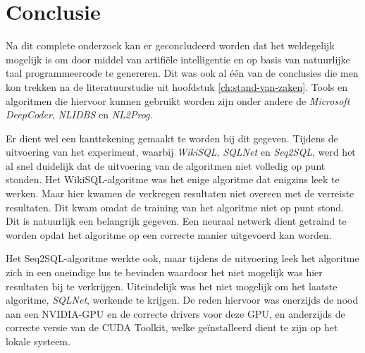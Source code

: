 
\chapter{Conclusie}
\label{ch:conclusie}


Na dit complete onderzoek kan er geconcludeerd worden dat het weldegelijk mogelijk is om door middel van artifiële intelligentie en op basis van natuurlijke taal programmeercode te genereren. Dit was ook al één van de conclusies die men kon trekken na de literatuurstudie uit hoofdstuk \ref{ch:stand-van-zaken}. Tools en algoritmen die hiervoor kunnen gebruikt worden zijn onder andere de \textit{Microsoft DeepCoder}, \textit{NLIDBS} en \textit{NL2Prog}.

Er dient wel een kanttekening gemaakt te worden bij dit gegeven. Tijdens de uitvoering van het experiment, waarbij \textit{WikiSQL}, \textit{SQLNet} en \textit{Seq2SQL}, werd het al snel duidelijk dat de uitvoering van de algoritmen niet volledig op punt stonden. Het WikiSQL-algoritme was het enige algoritme dat enigzins leek te werken. Maar hier kwamen de verkregen resultaten niet overeen met de verreiste resultaten. Dit kwam omdat de training van het algoritme niet op punt stond. Dit is natuurlijk een belangrijk gegeven. Een neuraal netwerk dient getraind te worden opdat het algoritme op een correcte manier uitgevoerd kan worden.

Het Seq2SQL-algoritme werkte ook, maar tijdens de uitvoering leek het algoritme zich in een oneindige lus te bevinden waardoor het niet mogelijk was hier resultaten bij te verkrijgen. Uiteindelijk was het niet mogelijk om het laatste algoritme, \textit{SQLNet}, werkende te krijgen. De reden hiervoor was enerzijds de nood aan een NVIDIA-GPU en de correcte drivers voor deze GPU, en anderzijds de correcte versie van de CUDA Toolkit, welke geïnstalleerd dient te zijn op het lokale systeem.

